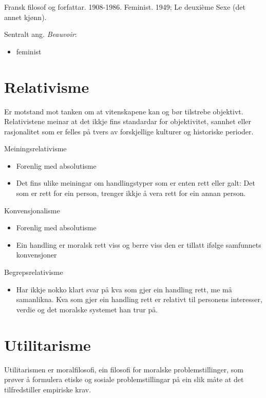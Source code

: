 \documentclass[a4paper]{IEEEtran}
\begin{document}
Fransk filosof og forfattar. 1908-1986. Feminist. 1949; Le deuxième Sexe (det annet kjønn). 
\bigskip

Sentralt ang. \textit{Beauvoir}:
\begin{itemize}\bigskip
     \item feminist
\end{itemize}\bigskip

\bigskip
\section{Relativisme}
\label{relativisme}
Er motstand mot tanken om at vitenskapene kan og bør tilstrebe objektivt. Relativistene meinar at det ikkje fins standardar for objektivitet, sannhet eller rasjonalitet som er felles på tvers av forskjellige kulturer og historiske perioder.
\bigskip

Meiningsrelativisme\bigskip
\begin{itemize}
    \item Forenlig med absolutisme
    \item Det fins ulike meiningar om handlingstyper som er enten rett eller galt: Det som er rett for ein person, trenger ikkje å vera rett for ein annan person.
\end{itemize}\bigskip

Konvensjonalisme\bigskip
\begin{itemize}
    \item Forenlig med absolutisme
    \item Ein handling er moralsk rett viss og berre viss den er tillatt ifølge samfunnets konvensjoner
\end{itemize}\bigskip

Begrepsrelativisme\bigskip
\begin{itemize}
    \item Har ikkje nokko klart svar på kva som gjer ein handling rett, me må samanlikna. Kva som gjer ein handling rett er relativt til personens interesser, verdie og det moralske systemet han trur på.
\end{itemize}

\bigskip
\section{Utilitarisme}
\label{utilitarisme}

Utilitarismen er moralfilosofi, ein filosofi for moralske problemstillinger, som prøver å formulera etiske og sosiale problemstillingar på ein slik måte at det tilfredstiller empiriske krav.
\bigskip
\end{document}
